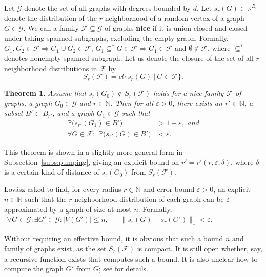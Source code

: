 \documentclass[12pt,a4paper]{article}
\newtheorem{Theorem}{Theorem}
\newcommand{\eps}{\varepsilon}
\newcommand{\F}{\mathcal{F}}
\newcommand{\G}{\mathcal{G}}
\newcommand{\N}{\mathbb{N}}
\renewcommand{\P}{\mathbb{P}}
\newcommand{\R}{\mathbb{R}}
\renewcommand{\:}{\colon}
\begin{document}
Let $\G$ denote the set of all graphs with degrees bounded by $d$.
Let $s_r(G) \in \R^{B_r}$ denote the distribution of the $r$-neighborhood of a random vertex of a graph $G \in \G$.
We call a family $\F \subseteq \G$ of graphs \textbf{nice} if it is union-closed and closed under taking spanned subgraphs, excluding the empty graph. 
Formally, $G_1, G_2 \in \F \Rightarrow G_1 \cup G_2 \in \F$, $G_1 \subseteq^* G \in \F \Rightarrow G_1 \in \F$ and $\emptyset \notin \F$, where $\subseteq^*$ denotes nonempty spanned subgraph. 
Let us denote the closure of the set of all $r$-neighborhood distributions in $\F$ by 
\begin{equation} \label{Ddef}
S_r(\F) = cl\big\{s_r(G) \ \big|\ G \in \F \big\}.
\end{equation}

\begin{Theorem} \label{separation}
Assume that $s_r(G_0) \notin S_r(\F)$ holds for a nice family $\F$ of graphs, a graph $G_0 \in \G$ and $r\in \N$.
Then for all $\eps > 0$, there exists an $r'\in \N$, a subset $B' \subset B_{r'}$, and a graph $G_1 \in \G$ such that 
\begin{align*}
\P\big(s_{r'}(G_1) \in B'\big) &> 1 -\eps, \,\, and\\
\forall G \in \F\: \,\, \P\big(s_{r'}(G) \in B'\big) &< \eps.
\end{align*}
\end{Theorem}

This theorem is shown in a slightly more general form in Subsection~\ref{subs:pumping}, giving an explicit bound on $r' = r'(r, \eps, \delta)$, where $\delta$ is a certain kind of distance of $s_r(G_0)$ from $S_r(\F)$.

Lovász \cite{Lovaszbook} asked to find, for every radius $r \in \N$ and error bound $\eps > 0$, an explicit $n \in \N$ such that the $r$-neighborhood distribution of each graph can be $\eps$-approximated by a graph of size at most $n$. Formally,
\begin{align} \label{ndef}
\forall G \in \G \: \exists G' \in \G \: \big|V(G')\big| \le n,
&& \big\|s_r(G) - s_r(G')\big\|_1 < \eps.
&&&&&&&&&&&&&&&&&&&&&&&&&
\end{align}

Without requiring an effective bound, it is obvious that such a bound $n$ and family of graphs exist, as the set $S_r(\F)$ is compact. 
It is still open whether, say, a recursive function exists that computes such a bound. 
It is also unclear how to compute the graph $G'$ from $G$; see \cite{Lovaszbook} for details.
\end{document}
